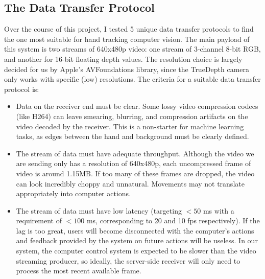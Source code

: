 \documentclass[12pt]{article}
\begin{document}
\subsection{The Data Transfer Protocol}
Over the course of this project, I tested 5 unique data transfer protocols to find the one most suitable for hand tracking computer vision. The main payload of this system is two streams of 640x480p video: one stream of 3-channel 8-bit RGB, and another for 16-bit floating depth values. The resolution choice is largely decided for us by Apple's AVFoundations library, since the TrueDepth camera only works with specific (low) resolutions. The criteria for a suitable data transfer protocol is:
\begin{itemize}
    \item Data on the receiver end must be clear. Some lossy video compression codecs (like H264) can leave smearing, blurring, and compression artifacts on the video decoded by the receiver. This is a non-starter for machine learning tasks, as edges between the hand and background must be clearly defined.
    \item The stream of data must have adequate throughput. Although the video we are sending only has a resolution of 640x480p, each uncompressed frame of video is around 1.15MB. If too many of these frames are dropped, the video can look incredibly choppy and unnatural. Movements may not translate appropriately into computer actions.
    \item The stream of data must have low latency (targeting $<50$ ms with a requirement of $<100$ ms, corresponding to 20 and 10 fps respectively). If the lag is too great, users will become disconnected with the computer's actions and feedback provided by the system on future actions will be useless. In our system, the computer control system is expected to be slower than the video streaming producer, so ideally, the server-side receiver will only need to process the most recent available frame.
\end{itemize}
\end{document}
